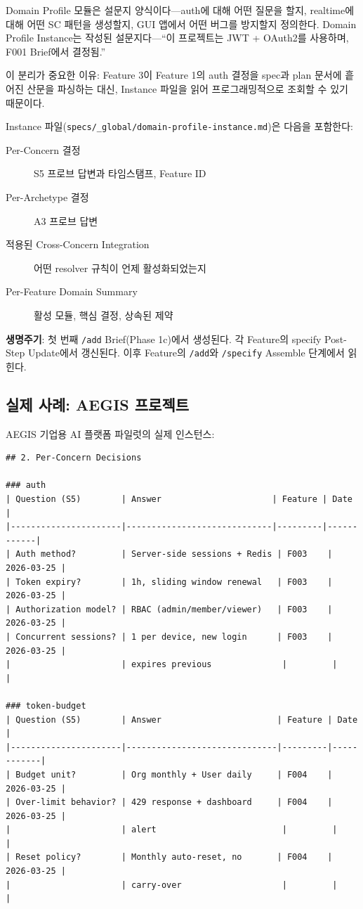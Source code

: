 \documentclass[11pt,a4paper,openright,twoside]{report}
\newcommand{\cmd}[1]{\texttt{/#1}}
\newcommand{\file}[1]{\texttt{#1}}
\begin{document}
\begin{tipbox}[설문지 비유]
Domain Profile 모듈은 설문지 양식이다---auth에 대해 어떤 질문을 할지, realtime에 대해 어떤 SC 패턴을 생성할지, GUI 앱에서 어떤 버그를 방지할지 정의한다. Domain Profile Instance는 작성된 설문지다---``이 프로젝트는 JWT + OAuth2를 사용하며, F001 Brief에서 결정됨.''

이 분리가 중요한 이유: Feature 3이 Feature 1의 auth 결정을 spec과 plan 문서에 흩어진 산문을 파싱하는 대신, Instance 파일을 읽어 프로그래밍적으로 조회할 수 있기 때문이다.
\end{tipbox}

Instance 파일(\file{specs/\_global/domain-profile-instance.md})은 다음을 포함한다:

\begin{description}
  \item[Per-Concern 결정] S5 프로브 답변과 타임스탬프, Feature ID
  \item[Per-Archetype 결정] A3 프로브 답변
  \item[적용된 Cross-Concern Integration] 어떤 resolver 규칙이 언제 활성화되었는지
  \item[Per-Feature Domain Summary] 활성 모듈, 핵심 결정, 상속된 제약
\end{description}

\textbf{생명주기}: 첫 번째 \cmd{add} Brief(Phase 1c)에서 생성된다. 각 Feature의 specify Post-Step Update에서 갱신된다. 이후 Feature의 \cmd{add}와 \cmd{specify} Assemble 단계에서 읽힌다.

\subsection{실제 사례: AEGIS 프로젝트}

AEGIS 기업용 AI 플랫폼 파일럿의 실제 인스턴스:

\begin{lstlisting}
## 2. Per-Concern Decisions

### auth
| Question (S5)        | Answer                      | Feature | Date       |
|----------------------|-----------------------------|---------|------------|
| Auth method?         | Server-side sessions + Redis | F003    | 2026-03-25 |
| Token expiry?        | 1h, sliding window renewal   | F003    | 2026-03-25 |
| Authorization model? | RBAC (admin/member/viewer)   | F003    | 2026-03-25 |
| Concurrent sessions? | 1 per device, new login      | F003    | 2026-03-25 |
|                      | expires previous              |         |            |

### token-budget
| Question (S5)        | Answer                       | Feature | Date       |
|----------------------|------------------------------|---------|------------|
| Budget unit?         | Org monthly + User daily     | F004    | 2026-03-25 |
| Over-limit behavior? | 429 response + dashboard     | F004    | 2026-03-25 |
|                      | alert                         |         |            |
| Reset policy?        | Monthly auto-reset, no       | F004    | 2026-03-25 |
|                      | carry-over                    |         |            |
\end{lstlisting}
\end{document}

